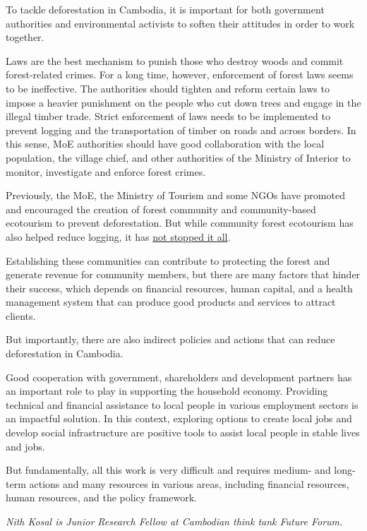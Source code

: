 \documentclass[10pt,a4paper]{letter}
\begin{document}
To tackle deforestation in Cambodia, it is important for both government authorities and environmental activists to soften their attitudes in order to work together.

Laws are the best mechanism to punish those who destroy woods and commit forest-related crimes. For a long time, however, enforcement of forest laws seems to be ineffective. The authorities should tighten and reform certain laws to impose a heavier punishment on the people who cut down trees and engage in the illegal timber trade. Strict enforcement of laws needs to be implemented to prevent logging and the transportation of timber on roads and across borders. In this sense, MoE authorities should have good collaboration with the local population, the village chief, and other authorities of the Ministry of Interior to monitor, investigate and enforce forest crimes.

Previously, the MoE, the Ministry of Tourism and some NGOs have promoted and encouraged the creation of forest community and community-based ecotourism to prevent deforestation. But while community forest ecotourism has also helped reduce logging, it has \href{https://link.springer.com/chapter/10.1007%2F978-981-15-8632-3_9}{not stopped it all}. 

Establishing these communities can contribute to protecting the forest and generate revenue for community members, but there are many factors that hinder their success, which depends on financial resources, human capital, and a health management system that can produce good products and services to attract clients.

But importantly, there are also indirect policies and actions that can reduce deforestation in Cambodia. 

Good cooperation with government, shareholders and development partners has an important role to play in supporting the household economy. Providing technical and financial assistance to local people in various employment sectors is an impactful solution. In this context, exploring options to create local jobs and develop social infrastructure are positive tools to assist local people in stable lives and jobs.
 
But fundamentally, all this work is very difficult and requires medium- and long-term actions and many resources in various areas, including financial resources, human resources, and the policy framework.

\textit{Nith Kosal is Junior Research Fellow at Cambodian think tank Future Forum.}
\end{document}
